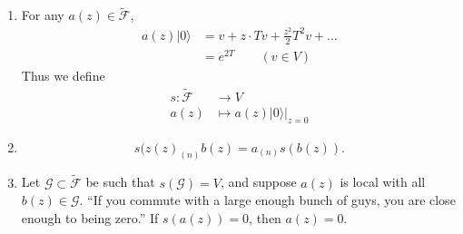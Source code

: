 \begin{theorem}
\label{theorem-}
\begin{enumerate}
\item For any $a(z) \in \tilde{\mathcal{F}}$,
\label{item-vertex-algebra-second-definition-1}
\begin{align*}
a(z)|0\rangle&=v+z\cdot Tv+\frac{z^2}{2}T^2v+\ldots\\
&=e^{2T}\qquad (v\in V)
\end{align*}
Thus we define
\begin{align*}
s: \tilde{\mathcal{F}} &\longrightarrow V \\
a(z) &\longmapsto a(z)|0\rangle|_{z=0}
\end{align*}

\item 
\label{item-vertex-algebra-second-definition-2}
$$
s(z(z)_{(n)}b(z)=a_{(n)}s(b(z)).
$$
\item Let $\mathcal{G} \subset \tilde{\mathcal{F}}$ be
\label{item-vertex-algebra-second-definition-3}
such that $s(\mathcal{G})=V$, and suppose
$a(z)$ is local with all $b(z) \in \mathcal{G}$.
``If you commute with a large enough bunch of guys,
you are close enough to being zero.''
If $s(a(z))=0$, then $a(z)=0$.
\end{enumerate}
\end{theorem}

